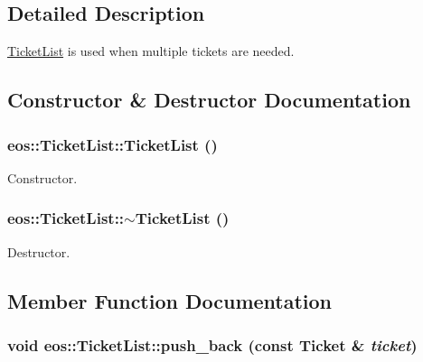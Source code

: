 \subsection{Detailed Description}
\hyperlink{classeos_1_1TicketList}{TicketList} is used when multiple tickets are needed. 

\subsection{Constructor \& Destructor Documentation}
\hypertarget{classeos_1_1TicketList_a7d61cc782f984a4ec8665d3cdfc5489a}{
\subsubsection[{TicketList}]{\setlength{\rightskip}{0pt plus 5cm}eos::TicketList::TicketList ()}}
\label{classeos_1_1TicketList_a7d61cc782f984a4ec8665d3cdfc5489a}


Constructor. \hypertarget{classeos_1_1TicketList_a948cabad909856a5d32cd3f90156b4d1}{
\subsubsection[{$\sim$TicketList}]{\setlength{\rightskip}{0pt plus 5cm}eos::TicketList::$\sim$TicketList ()}}
\label{classeos_1_1TicketList_a948cabad909856a5d32cd3f90156b4d1}


Destructor. 

\subsection{Member Function Documentation}
\hypertarget{classeos_1_1TicketList_a150d362cc9ab4ffdb821edec64b76abe}{
\subsubsection[{push\_\-back}]{\setlength{\rightskip}{0pt plus 5cm}void eos::TicketList::push\_\-back (const {\bf Ticket} \& {\em ticket})}}
\label{classeos_1_1TicketList_a150d362cc9ab4ffdb821edec64b76abe}


